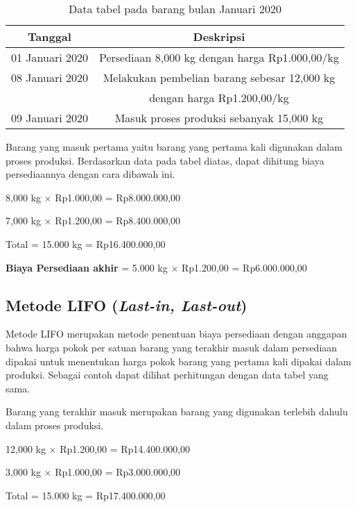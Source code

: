 	\begin{table}[H]	
		\begin{center}
			\caption{Data tabel pada barang bulan Januari 2020}
			\label{tab:table1}
			\begin{tabular}{c|c} %
			\textbf{Tanggal} & \textbf{Deskripsi} \\
			\hline
			01 Januari 2020 & Persediaan 8,000 kg dengan harga Rp1.000,00/kg \\
			08 Januari 2020 & Melakukan pembelian barang sebesar 12,000 kg \\
			&  dengan harga Rp1.200,00/kg \\
			09 Januari 2020 & Masuk proses produksi sebanyak 15,000 kg \\
			\end{tabular}
		\end{center}
	\end{table}

Barang yang masuk pertama yaitu barang yang pertama kali digunakan dalam proses produksi. Berdasarkan data pada tabel diatas, dapat dihitung biaya persediaannya dengan cara dibawah ini. 

8,000 kg $\times$ Rp1.000,00 = Rp8.000.000,00

7,000 kg $\times$ Rp1.200,00 = Rp8.400.000,00

Total = 15.000 kg = Rp16.400.000,00

\textbf{Biaya Persediaan akhir} = 5.000 kg $\times$ Rp1.200,00 = Rp6.000.000,00

\subsection{Metode LIFO (\textit{Last-in, Last-out})}

Metode LIFO merupakan metode penentuan biaya persediaan dengan anggapan bahwa harga pokok per satuan barang yang terakhir masuk dalam persediaan dipakai untuk menentukan harga pokok barang yang pertama kali dipakai dalam produksi. Sebagai contoh dapat dilihat perhitungan dengan data tabel yang sama.

Barang yang terakhir masuk merupakan barang yang digunakan terlebih dahulu dalam proses produksi.

12,000 kg $\times$ Rp1.200,00 = Rp14.400.000,00

3,000 kg $\times$ Rp1.000,00 = Rp3.000.000,00

Total = 15.000 kg = Rp17.400.000,00

